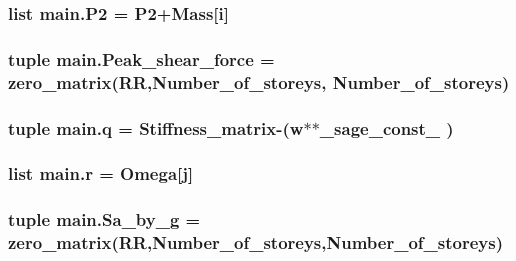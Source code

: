 \subsubsection[{P2}]{\setlength{\rightskip}{0pt plus 5cm}list main.\+P2 = P2+Mass\mbox{[}{\bf i}\mbox{]}}\label{namespacemain_a1b83b7a3849a8e1c84b9906c45625fec}
\hypertarget{namespacemain_a6461376590c833b81e5920e96ed3d5bf}{}
\subsubsection[{Peak\+\_\+shear\+\_\+force}]{\setlength{\rightskip}{0pt plus 5cm}tuple main.\+Peak\+\_\+shear\+\_\+force = zero\+\_\+matrix(R\+R,Number\+\_\+of\+\_\+storeys, Number\+\_\+of\+\_\+storeys)}\label{namespacemain_a6461376590c833b81e5920e96ed3d5bf}
\hypertarget{namespacemain_a1787a37505189f764069a45071189112}{}
\subsubsection[{q}]{\setlength{\rightskip}{0pt plus 5cm}tuple main.\+q = {\bf Stiffness\+\_\+matrix}-\/({\bf w}$\ast$$\ast${\bf \+\_\+sage\+\_\+const\+\_} )}\label{namespacemain_a1787a37505189f764069a45071189112}
\hypertarget{namespacemain_a4760f4121f66000c5570f75176649cb8}{}
\subsubsection[{r}]{\setlength{\rightskip}{0pt plus 5cm}list main.\+r = {\bf Omega}\mbox{[}{\bf j}\mbox{]}}\label{namespacemain_a4760f4121f66000c5570f75176649cb8}
\hypertarget{namespacemain_a01374e7fea2c00172c845c7a5c71cfae}{}
\subsubsection[{Sa\+\_\+by\+\_\+g}]{\setlength{\rightskip}{0pt plus 5cm}tuple main.\+Sa\+\_\+by\+\_\+g = zero\+\_\+matrix(R\+R,Number\+\_\+of\+\_\+storeys,Number\+\_\+of\+\_\+storeys)}\label{namespacemain_a01374e7fea2c00172c845c7a5c71cfae}
\hypertarget{namespacemain_a0011be18dbc87087d6aaf28802f121c0}{}
